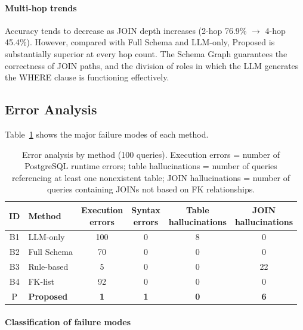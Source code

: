 \documentclass[5p,twocolumn]{elsarticle}
\begin{document}
\paragraph{Multi-hop trends}

Accuracy tends to decrease as JOIN depth increases (2-hop 76.9\% $\to$ 4-hop 45.4\%).
However, compared with Full Schema and LLM-only,
Proposed is substantially superior at every hop count.
The Schema Graph guarantees the correctness of JOIN paths,
and the division of roles in which the LLM generates the WHERE clause is functioning effectively.
\subsection{Error Analysis}
\label{sec:error_analysis}

Table~\ref{tab:error_analysis} shows the major failure modes of each method.

\begin{table}[htbp]
  \centering
  \caption{Error analysis by method (100 queries). Execution errors = number of PostgreSQL runtime errors; table hallucinations = number of queries referencing at least one nonexistent table; JOIN hallucinations = number of queries containing JOINs not based on FK relationships.}
  \label{tab:error_analysis}
  \small
  \begin{tabular}{clcccc}
    \toprule
    ID & Method & \shortstack{Execution\\errors} & \shortstack{Syntax\\errors} & \shortstack{Table\\hallucinations} & \shortstack{JOIN\\hallucinations} \\
    \midrule
    B1 & LLM-only & 100 & 0 & 8 & 0 \\
    B2 & Full Schema & 70 & 0 & 0 & 0 \\
    B3 & Rule-based & 5 & 0 & 0 & 22 \\
    B4 & FK-list & 92 & 0 & 0 & 0 \\
    P & \textbf{Proposed} & \textbf{1} & \textbf{1} & \textbf{0} & \textbf{6} \\
    \bottomrule
  \end{tabular}
\end{table}

\paragraph{Classification of failure modes}
\end{document}
